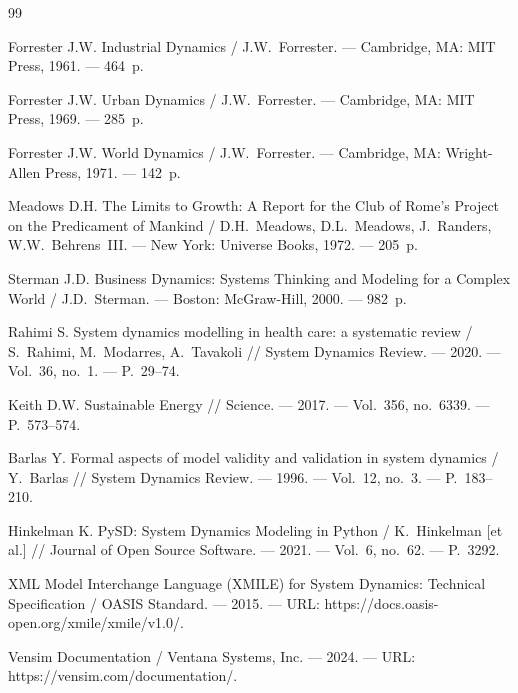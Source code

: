 
\begin{thebibliography}{99}

    Forrester J.W. Industrial Dynamics / J.W.~Forrester. --- Cambridge, MA: MIT Press, 1961. --- 464~p.

    Forrester J.W. Urban Dynamics / J.W.~Forrester. --- Cambridge, MA: MIT Press, 1969. --- 285~p.

    Forrester J.W. World Dynamics / J.W.~Forrester. --- Cambridge, MA: Wright-Allen Press, 1971. --- 142~p.

    Meadows D.H. The Limits to Growth: A Report for the Club of Rome's Project on the Predicament of Mankind / D.H.~Meadows, D.L.~Meadows, J.~Randers, W.W.~Behrens~III. --- New York: Universe Books, 1972. --- 205~p.

    Sterman J.D. Business Dynamics: Systems Thinking and Modeling for a Complex World / J.D.~Sterman. --- Boston: McGraw-Hill, 2000. --- 982~p.

    Rahimi S. System dynamics modelling in health care: a systematic review / S.~Rahimi, M.~Modarres, A.~Tavakoli // System Dynamics Review. --- 2020. --- Vol.~36, no.~1. --- P.~29--74.

    Keith D.W. Sustainable Energy // Science. --- 2017. --- Vol.~356, no.~6339. --- P.~573--574.

    Barlas Y. Formal aspects of model validity and validation in system dynamics / Y.~Barlas // System Dynamics Review. --- 1996. --- Vol.~12, no.~3. --- P.~183--210.

    Hinkelman K. PySD: System Dynamics Modeling in Python / K.~Hinkelman [et al.] // Journal of Open Source Software. --- 2021. --- Vol.~6, no.~62. --- P.~3292.

    XML Model Interchange Language (XMILE) for System Dynamics: Technical Specification / OASIS Standard. --- 2015. --- URL: https://docs.oasis-open.org/xmile/xmile/v1.0/.

    Vensim Documentation / Ventana Systems, Inc. --- 2024. --- URL: https://vensim.com/documentation/.


\end{thebibliography}
